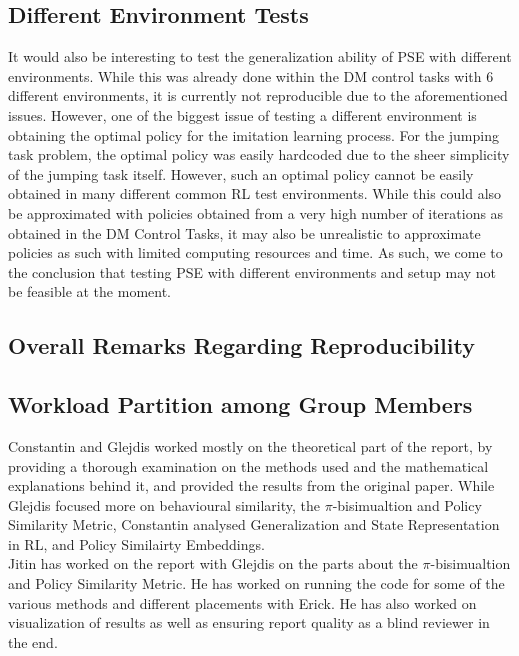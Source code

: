 \documentclass{usiinftr}
\begin{document}
\subsection{Different Environment Tests}
It would also be interesting to test the generalization ability of PSE with different environments. While this was already done within the DM control tasks with 6 different environments, it is currently not reproducible due to the aforementioned issues. However, one of the biggest issue of testing a different environment is obtaining the optimal policy for the imitation learning process. For the jumping task problem, the optimal policy was easily hardcoded due to the sheer simplicity of the jumping task itself. However, such an optimal policy cannot be easily obtained in many different common RL test environments. While this could also be approximated with policies obtained from a very high number of iterations as obtained in the DM Control Tasks, it may also be unrealistic to approximate policies as such with limited computing resources and time. As such, we come to the conclusion that testing PSE with different environments and setup may not be feasible at the moment. 
\subsection{Overall Remarks Regarding Reproducibility}
\subsection{Workload Partition among Group Members}
Constantin and Glejdis worked mostly on the theoretical part of the report, by providing a thorough examination on the methods used and the mathematical explanations behind it, and provided the results from the original paper. While Glejdis focused more on behavioural similarity, the $\pi$-bisimualtion and Policy Similarity Metric, Constantin analysed Generalization and State Representation in RL, and Policy Similairty Embeddings. \\
Jitin has worked on the report with Glejdis on the parts about the $\pi$-bisimualtion and Policy Similarity Metric. He has worked on running the code for some of the various methods and different placements with Erick. He has also worked on visualization of results as well as ensuring report quality as a blind reviewer in the end.\\


\end{document}
